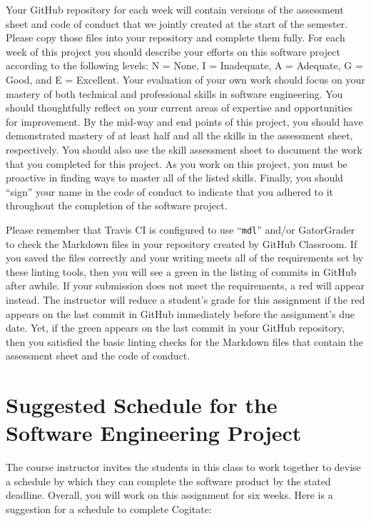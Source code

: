 \documentclass[11pt]{article}
\newcommand{\command}[1]{``\lstinline{#1}''}
\newcommand{\checkmark}{\ding{51}}
\newcommand{\naughtmark}{\ding{55}}
\begin{document}
Your GitHub repository for each week will contain versions of the assessment
sheet and code of conduct that we jointly created at the start of the semester.
Please copy those files into your repository and complete them fully. For each
week of this project you should describe your efforts on this software project
according to the following levels: N = None, I = Inadequate, A = Adequate, G =
Good, and E = Excellent. Your evaluation of your own work should focus on your
mastery of both technical and professional skills in software engineering. You
should thoughtfully reflect on your current areas of expertise and opportunities
for improvement. By the mid-way and end points of this project, you should have
demonstrated mastery of at least half and all the skills in the assessment
sheet, respectively. You should also use the skill assessment sheet to document
the work that you completed for this project. As you work on this project, you
must be proactive in finding ways to master all of the listed skills. Finally,
you should ``sign'' your name in the code of conduct to indicate that you
adhered to it throughout the completion of the software project.


Please remember that Travis CI is configured to use \command{mdl} and/or
GatorGrader to check the Markdown files in your repository created by GitHub
Classroom.
%
If you saved the files correctly and your writing meets all of the requirements
set by these linting tools, then you will see a green \checkmark{} in the
listing of commits in GitHub after awhile. If your submission does not meet the
requirements, a red \naughtmark{} will appear instead. The instructor will
reduce a student's grade for this assignment if the red \naughtmark{} appears on
the last commit in GitHub immediately before the assignment's due date. Yet, if
the green \checkmark{} appears on the last commit in your GitHub repository,
then you satisfied the basic linting checks for the Markdown files that contain
the assessment sheet and the code of conduct.

\section*{Suggested Schedule for the Software Engineering Project}

The course instructor invites the students in this class to work together to
devise a schedule by which they can complete the software product by the stated
deadline. Overall, you will work on this assignment for six weeks. Here is a
suggestion for a schedule to complete Cogitate:
\end{document}
